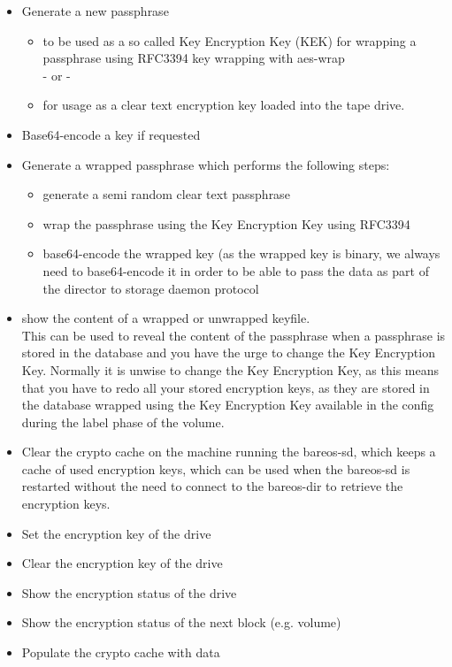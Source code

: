 \begin{itemize}
 \item Generate a new passphrase
 \begin{itemize}
  \item to be used as a so called Key Encryption Key (KEK) for wrapping a passphrase using RFC3394 key wrapping with aes-wrap\\- or -
  \item for usage as a clear text encryption key loaded into the tape drive.
 \end{itemize}
 \item Base64-encode a key if requested
 \item Generate a wrapped passphrase which performs the following steps:
 \begin{itemize}
  \item generate a semi random clear text passphrase
  \item wrap the passphrase using the Key Encryption Key using RFC3394
  \item base64-encode the wrapped key (as the wrapped key is binary, we always need to base64-encode it in order to be able to pass the data as part of the director to storage daemon protocol
 \end{itemize}
 \item show the content of a wrapped or unwrapped keyfile.\\This can be used to reveal the content of the passphrase when a passphrase is stored in the database and you have the urge to change the Key Encryption Key. Normally it is unwise to change the Key Encryption Key, as this means that you have to redo all your stored encryption keys, as they are stored in the database wrapped using the Key Encryption Key available in the config during the label phase of the volume.
 \item Clear the crypto cache on the machine running the bareos-sd, which keeps a cache of used encryption keys, which can be used when the bareos-sd is restarted without the need to connect to the bareos-dir to retrieve the encryption keys.
 \item Set the encryption key of the drive
 \item Clear the encryption key of the drive
 \item Show the encryption status of the drive
 \item Show the encryption status of the next block (e.g. volume)
 \item Populate the crypto cache with data
\end{itemize}

